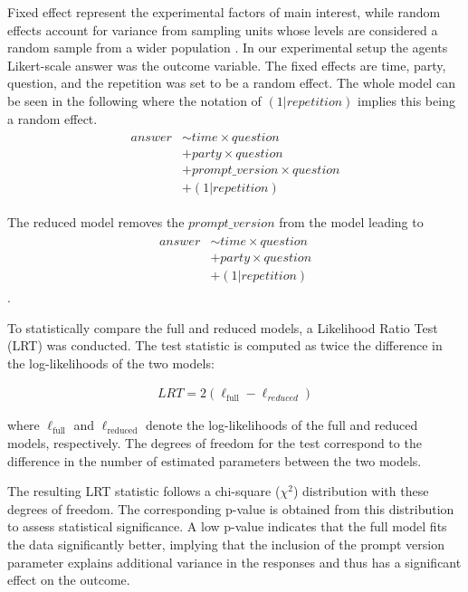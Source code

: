 Fixed effect represent the experimental factors of main interest, while random effects account for variance from sampling units whose levels are considered a random sample from a wider population \citep{Bolker2009Trends}. In our experimental setup the agents Likert-scale answer was the outcome variable. The fixed effects are time, party, question, and the repetition was set to be a random effect. The whole model can be seen in the following where the notation of $(1|repetition)$ implies this being a random effect.  
\begin{align}
\label{equ:full_model}
\begin{split}
    answer & \sim time \times question \\
    &+ party \times question \\ 
    &+ prompt\_version \times question \\
    &+ (1 |repetition)
\end{split}
\end{align}

The reduced model removes the $prompt\_version$ from the model leading to 
\begin{align}
\begin{split}
    answer & \sim time \times question \\
    &+ party \times question \\ 
    &+ (1 |repetition)
\end{split}
\end{align}.

To statistically compare the full and reduced models, a Likelihood Ratio Test (LRT) was conducted. The test statistic is computed as twice the difference in the log-likelihoods of the two models:

\begin{align}
    LRT = 2 ( \ell_{\text{full}} - \ell_{reduced})
\end{align}

where $\ell_{\text{full}}$ and $\ell_{\text{reduced}}$ denote the log-likelihoods of the full and reduced models, respectively.
The degrees of freedom for the test correspond to the difference in the number of estimated parameters between the two models.

The resulting LRT statistic follows a chi-square ($\chi^2$) distribution with these degrees of freedom. The corresponding p-value is obtained from this distribution to assess statistical significance. A low p-value indicates that the full model fits the data significantly better, implying that the inclusion of the prompt version parameter explains additional variance in the responses and thus has a significant effect on the outcome.

